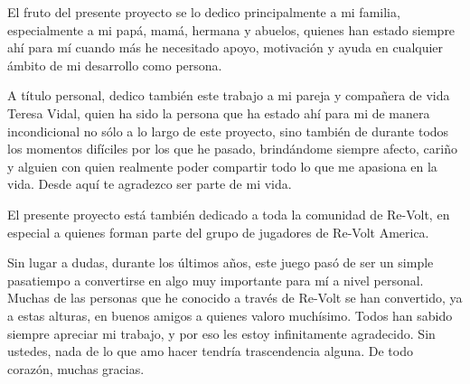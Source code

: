 El fruto del presente proyecto se lo dedico principalmente a mi familia, especialmente a mi papá, mamá, hermana y abuelos, quienes han estado siempre ahí para mí cuando más he necesitado apoyo, motivación y ayuda en cualquier ámbito de mi desarrollo como persona.

A título personal, dedico también este trabajo a mi pareja y compañera de vida Teresa Vidal, quien ha sido la persona que ha estado ahí para mi de manera incondicional no sólo a lo largo de este proyecto, sino también de durante todos los momentos difíciles por los que he pasado, brindándome siempre afecto, cariño y alguien con quien realmente poder compartir todo lo que me apasiona en la vida. Desde aquí te agradezco ser parte de mi vida.

El presente proyecto está también dedicado a toda la comunidad de Re-Volt, en especial a quienes forman parte del grupo de jugadores de Re-Volt America.

Sin lugar a dudas, durante los últimos años, este juego pasó de ser un simple pasatiempo a convertirse en algo muy importante para mí a nivel personal. Muchas de las personas que he conocido a través de Re-Volt se han convertido, ya a estas alturas, en buenos amigos a quienes valoro muchísimo. Todos han sabido siempre apreciar mi trabajo, y por eso les estoy infinitamente agradecido. Sin ustedes, nada de lo que amo hacer tendría trascendencia alguna. De todo corazón, muchas gracias.
